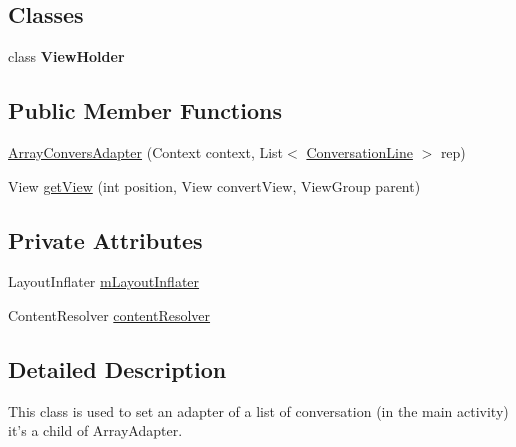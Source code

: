 \subsection*{Classes}
\begin{DoxyCompactItemize}
\item 
class {\bfseries View\+Holder}
\end{DoxyCompactItemize}
\subsection*{Public Member Functions}
\begin{DoxyCompactItemize}
\item 
\hyperlink{a00003_a6c4aeef04be96ad661e6cb67f4f192cf}{Array\+Convers\+Adapter} (Context context, List$<$ \hyperlink{a00008}{Conversation\+Line} $>$ rep)
\item 
View \hyperlink{a00003_af6292d542d7937de5b4044234a2db905}{get\+View} (int position, View convert\+View, View\+Group parent)
\end{DoxyCompactItemize}
\subsection*{Private Attributes}
\begin{DoxyCompactItemize}
\item 
Layout\+Inflater \hyperlink{a00003_a4e02ab86d39fcfd990b8dd2f36ccc3c9}{m\+Layout\+Inflater}
\item 
Content\+Resolver \hyperlink{a00003_a261822b570bfffa0c90ead212414c9b6}{content\+Resolver}
\end{DoxyCompactItemize}


\subsection{Detailed Description}
This class is used to set an adapter of a list of conversation (in the main activity) it's a child of Array\+Adapter. 

